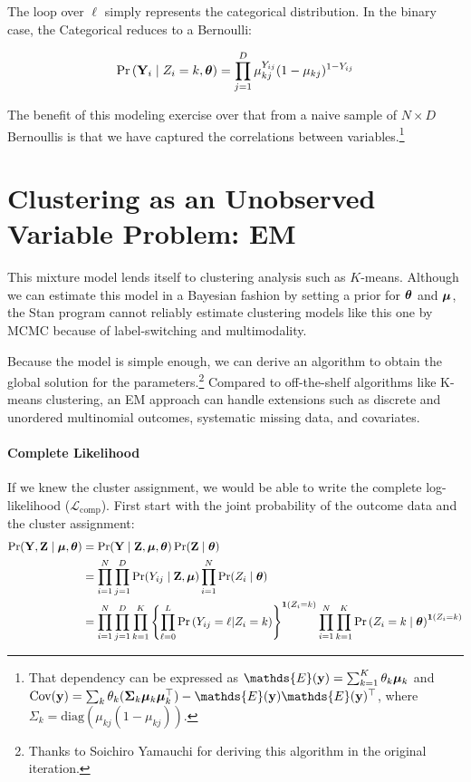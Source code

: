 \documentclass[11pt]{article}
\begin{document}
The loop over \(\ell\) simply represents the categorical distribution. In the binary case, the Categorical reduces to a Bernoulli:

\begin{align}
\mathbb{\Pr}\left(\mathbf{Y}_{i} \mid Z_{i} = k, \bm{\theta}\right) = \prod^{D}_{j=1}\mu_{kj}^{Y_{ij}}(1 - \mu_{kj})^{1- Y_{ij}}\nonumber
\end{align}




The benefit of this modeling exercise over that from a naive sample of
\(N \times D\) Bernoullis is that we have captured the correlations
between variables.\footnote{That dependency can be expressed as \(\mathds{E}(\by) = \sum_{k = 1}^{K} \theta_{k} \bmu_{k}\) and 
\(\cov({\by}) = \sum_{k} \theta_{k} (\mathbf{\Sigma}_k \bmu_k\bmu_{k}^{\top}) - \mathds{E}(\by)\mathds{E}(\by)^\top\), where \(\Sigma_k = \text{diag}(\mu_{kj}(1 - \mu_{kj}))\).}


\section{Clustering as an Unobserved Variable Problem: EM}

This mixture model lends itself to clustering analysis such as \(K\)-means. Although we can estimate this model in a Bayesian fashion by setting a prior for \(\bm{\theta}\) and \(\bm{\mu}\), the \textsf{Stan} program cannot reliably estimate clustering models like this one by MCMC because of label-switching and multimodality. 

Because the model is simple enough, we can derive an algorithm to obtain the global solution for the parameters.\footnote{Thanks to Soichiro Yamauchi for deriving this algorithm in the original iteration.} Compared to off-the-shelf algorithms like K-means clustering, an EM approach can handle extensions such as discrete and unordered multinomial outcomes, systematic missing data, and covariates. 

\paragraph{Complete Likelihood} If we knew the cluster assignment, we would be able to write the complete log-likelihood (\(\mathcal{L}_{\text{comp}}\)). First start with the joint probability of the outcome data and the cluster assignment:
\begin{align}
\Pr(\mathbf{Y}, \mathbf{Z} \mid \bm{\mu}, \bm{\theta}) &= \Pr(\mathbf{Y} \mid \mathbf{Z}, \bm{\mu}, \bm{\theta})\Pr(\mathbf{Z} \mid \bm{\theta})\nonumber\\
&= \prod^{N}_{i=1}\prod^{D}_{j=1}\Pr(Y_{ij} \mid \mathbf{Z}, \bm{\mu}) \prod^N_{i=1}\Pr(Z_i \mid \bm{\theta})\nonumber\\
&= \prod^{N}_{i=1}\prod^{D}_{j=1}\prod^{K}_{k=1}\left\{\prod^{L}_{\ell=0}\mathbb{\Pr}\left(Y_{ij} = \ell | Z_i = k\right)\right\}^{\bm{1}\left(Z_i=k\right)} \prod^N_{i=1}\prod^K_{k=1}\mathbb{\Pr}\left(Z_i = {k} \mid \bm{\theta}\right)^{\bm{1}\left(Z_i = k\right)}\nonumber
\end{align}
\end{document}
